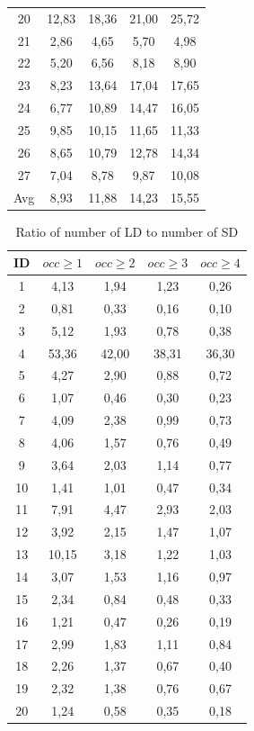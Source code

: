 \documentclass[12pt]{mitthesis}
\begin{document}
\begin{table}[H]
\begin{tabular}{|c|c|c|c|c|}
20	&	12,83	&	18,36	&	21,00	&	25,72	\\
21	&	2,86	&	4,65	&	5,70	&	4,98	\\
22	&	5,20	&	6,56	&	8,18	&	8,90	\\
23	&	8,23	&	13,64	&	17,04	&	17,65	\\
24	&	6,77	&	10,89	&	14,47	&	16,05	\\
25	&	9,85	&	10,15	&	11,65	&	11,33	\\
26	&	8,65	&	10,79	&	12,78	&	14,34	\\
27	&	7,04	&	8,78	&	9,87	&	10,08	\\
\hline
Avg	&	8,93	&	11,88	&	14,23	&	15,55	\\
\hline
\end{tabular}
\end{table}


\begin{table}[H]
\caption{Ratio of number of LD to number of SD}
\label{table:ld_ratio}
\centering
\begin{tabular}{|c|c|c|c|c|}
\hline
    ID  & $occ\geq 1$ & $occ\geq 2$ & $occ\geq 3$ & $occ\geq 4$  \\
\hline
1	&	4,13	&	1,94	&	1,23	&	0,26	\\
2	&	0,81	&	0,33	&	0,16	&	0,10	\\
3	&	5,12	&	1,93	&	0,78	&	0,38	\\
4	&	53,36	&	42,00	&	38,31	&	36,30	\\
5	&	4,27	&	2,90	&	0,88	&	0,72	\\
6	&	1,07	&	0,46	&	0,30	&	0,23	\\
7	&	4,09	&	2,38	&	0,99	&	0,73	\\
8	&	4,06	&	1,57	&	0,76	&	0,49	\\
9	&	3,64	&	2,03	&	1,14	&	0,77	\\
10	&	1,41	&	1,01	&	0,47	&	0,34	\\
11	&	7,91	&	4,47	&	2,93	&	2,03	\\
12	&	3,92	&	2,15	&	1,47	&	1,07	\\
13	&	10,15	&	3,18	&	1,22	&	1,03	\\
14	&	3,07	&	1,53	&	1,16	&	0,97	\\
15	&	2,34	&	0,84	&	0,48	&	0,33	\\
16	&	1,21	&	0,47	&	0,26	&	0,19	\\
17	&	2,99	&	1,83	&	1,11	&	0,84	\\
18	&	2,26	&	1,37	&	0,67	&	0,40	\\
19	&	2,32	&	1,38	&	0,76	&	0,67	\\
20	&	1,24	&	0,58	&	0,35	&	0,18	\\

\end{tabular}
\end{table}
\end{document}
